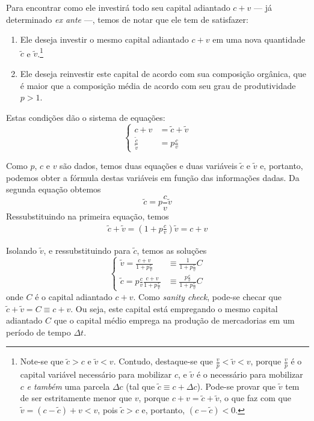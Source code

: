 Para encontrar como ele investirá todo seu capital adiantado $c+v$ — já determinado \textit{ex ante} —, temos de notar que ele tem de satisfazer:
\begin{enumerate}
\item Ele deseja investir o mesmo capital adiantado $c+v$ em uma nova quantidade $\tilde{c}$ e $\tilde{v}$.\footnote{Note-se que $\tilde{c}>c$ e $\tilde{v}<v$. Contudo, destaque-se que $\frac{v}{p}< \tilde{v} < v$, porque $\frac{v}{p}$ é o capital variável necessário para mobilizar $c$, e $\tilde{v}$ é o necessário para mobilizar $c$ \textit{e também} uma parcela $\Delta c$ (tal que $\tilde{c} \equiv c + \Delta c$). Pode-se provar que $\tilde{v}$ tem de ser estritamente menor que $v$, porque $c+v=\tilde{c}+\tilde{v}$, o que faz com que $\tilde{v}= (c-\tilde{c})+v<v$, pois $\tilde{c}>c$ e, portanto, $(c-\tilde{c})<0$.  } 
\item Ele deseja reinvestir este capital de acordo com sua composição orgânica, que é maior que a composição média de acordo com seu grau de produtividade $p>1$. 
\end{enumerate}

Estas condições dão o sistema de equações:
$$
\begin{cases}
c+v&=\tilde{c}+\tilde{v} \\
\frac{\tilde{c}}{\tilde{v}} &= p \frac{c}{v}
\end{cases}

$$

Como $p$, $c$ e $v$ são dados, temos duas equações e duas variáveis $\tilde{c}$ e $\tilde{v}$ e, portanto, podemos obter a fórmula destas variáveis em função das informações dadas. Da segunda equação obtemos
$$
\tilde{c} = p \frac{c}{v} \tilde{v}
$$
Ressubstituindo na primeira equação, temos
\begin{align*}
\tilde{c}+\tilde{v} = \left( 1+p \frac{c}{v} \right) \tilde{v} = c+v
\end{align*}

Isolando $\tilde{v}$, e ressubstituindo para $\tilde{c}$, temos as soluções
$$
\begin{cases}
\tilde{v} = \frac{c+v}{1+p \frac{c}{v}} &\equiv \frac{1}{1+p \frac{c}{v}} C \\
\tilde{c} = p \frac{c}{v} \frac{c+v}{1+p \frac{c}{v}} &\equiv \frac{p \frac{c}{v}}{1+p \frac{c}{v}} C
\end{cases}

$$
onde $C$ é o capital adiantado $c+v$. Como \textit{sanity check}, pode-se checar que $\tilde{c}+\tilde{v} = C \equiv c+v$. Ou seja, este capital está empregando o mesmo capital adiantado $C$ que o capital médio emprega na produção de mercadorias em um período de tempo $\Delta t$.

